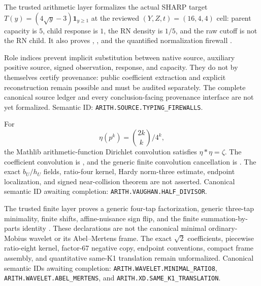 \begin{theorem}
\label{thm:B-source-firewalls}
The trusted arithmetic layer formalizes the actual SHARP target
\(T(y)=(4\sqrt y-3)\mathbf 1_{y\ge1}\) at the reviewed
\((Y,Z,t)=(16,4,4)\) cell: parent capacity is \(5\), child response is
\(1\), the RN density is \(1/5\), and the raw cutoff is not the RN child.
It also proves
,
,
and the quantified normalization firewall
.

Role indices prevent implicit substitution between native source, auxiliary
positive source, signed observation, response, and capacity.  They do not by
themselves certify provenance: public coefficient extraction and explicit
reconstruction remain possible and must be audited separately.
\notready
The complete canonical source ledger and every conclusion-facing provenance
interface are not yet formalized.
Semantic ID: \texttt{ARITH.SOURCE.TYPING\_FIREWALLS}.
\end{theorem}

\begin{theorem}
\label{thm:B-half-divisor-local}
For
\[
 \eta(p^k)=\binom{2k}{k}/4^k,
\]
the Mathlib arithmetic-function Dirichlet convolution satisfies
\(\eta*\eta=\zeta\).  The coefficient convolution is
, and the
generic finite convolution cancellation is
.
\notready
The exact \(b_U/h_U\) fields, ratio-four kernel, Hardy norm-three estimate,
endpoint localization, and signed near-collision theorem are not asserted.
Canonical semantic ID awaiting completion:
\texttt{ARITH.VAUGHAN.HALF\_DIVISOR}.
\end{theorem}

\begin{theorem}
\label{thm:B-wavelet-generic}
The trusted finite layer proves a generic four-tap factorization, generic
three-tap minimality, finite shifts, affine-nuisance sign flip, and the finite
summation-by-parts identity
.
\notready
These declarations are not the canonical minimal ordinary-Mobius wavelet or
its Abel--Mertens frame.  The exact \(\sqrt2\) coefficients, piecewise
ratio-eight kernel, factor-67 negative copy, endpoint conventions, compact
frame assembly, and quantitative same-K1 translation remain unformalized.
Canonical semantic IDs awaiting completion:
\texttt{ARITH.WAVELET.MINIMAL\_RATIO8},
\texttt{ARITH.WAVELET.ABEL\_MERTENS}, and
\texttt{ARITH.XD.SAME\_K1\_TRANSLATION}.
\end{theorem}

